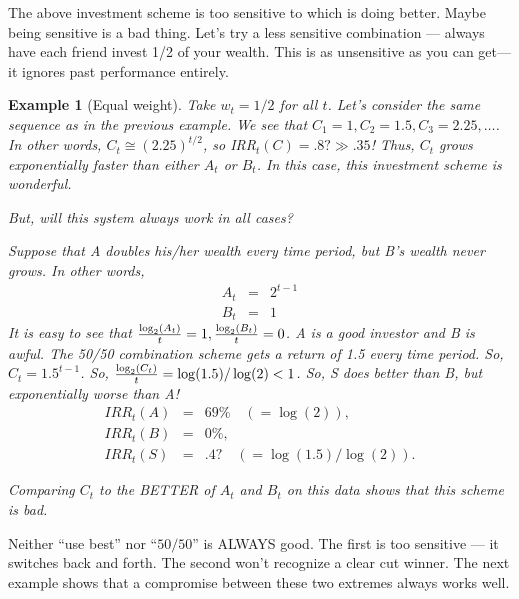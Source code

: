 \documentclass{book}
\newtheorem{example}{Example}[chapter]
\begin{document}
The above investment scheme is too sensitive to which is doing better.
Maybe being sensitive is a bad thing.  Let's try a less sensitive
combination --- always have each friend invest 1/2 of your wealth.
This is as unsensitive as you can get---it ignores past performance
entirely.

\begin{example}[Equal weight] \label{exam:equalWEIGHTS} Take $w_{t}= 1/2$ for all $t$.
  Let's consider the same sequence as in the previous example.  We see
  that $C_{1}=1, C_{2}=1.5, C_{3}= 2.25, \ldots $.  In other words,
  $C_{t}\cong (2.25)^{t/2}$, so IRR$_t(C) = .8? \gg .35$!  Thus,
  $C_{t}$ grows exponentially faster than either $A_{t}$ or $B_{t}$.
  In this case, this investment scheme is wonderful. 

  But, will this system always work in all cases?

  Suppose that A doubles his/her wealth every time period, but B's wealth
  never grows.  In other words,
  \begin{eqnarray*}
    A_{t}&=&2^{t-1} \\
    B_{t}&=&1 
  \end{eqnarray*}
  It is easy to see that ${\log_{2}(A_{t})\over t} = 1,
  {\log_{2}(B_{t})\over t} = 0$.  A is a good investor and B is
  awful.  The 50/50 combination
  scheme gets a return of 1.5 every time period.  So,
  $C_{t}=1.5^{t-1}$.  So, ${\log_{2}(C_{t})\over t} =
  \log(1.5)/\log(2) < 1$.  So, S does better than B, but exponentially
  worse than A!
  \begin{eqnarray*}
    IRR_t(A) & = & 69\% \quad (=\log(2)), \\
    IRR_t(B) & = & 0\%, \\
    IRR_t(S) &  =   & .4? \quad (=\log(1.5)/\log(2)).
  \end{eqnarray*}

   Comparing $C_{t}$ to the BETTER of $A_{t}$ and $B_{t}$ on this
  data shows that this scheme is bad.  
\end{example}
  
Neither ``use best'' nor ``$50/50$'' is ALWAYS good.  The first is too
sensitive --- it switches back and forth.  The second won't recognize a
clear cut winner.  The next example shows that a compromise between
these two extremes always works well.
\end{document}
